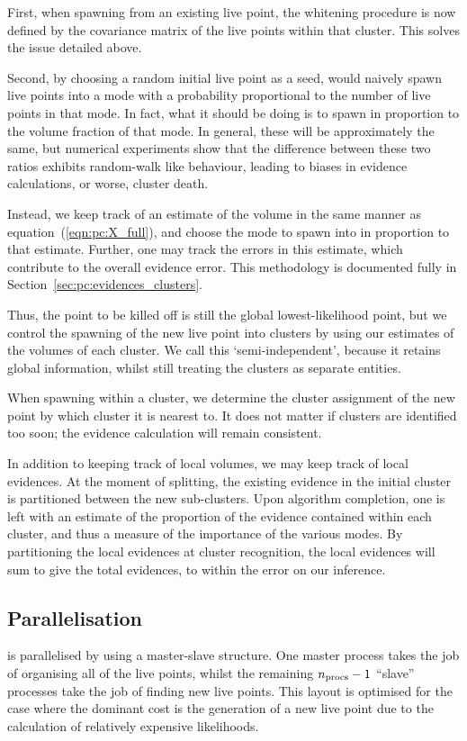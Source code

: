 First, when spawning from an existing live point, the whitening procedure is now defined by the covariance matrix of the live points within that cluster. This solves the issue detailed above.

Second, by choosing a random initial live point as a seed, \PolyChord{} would naively spawn live points into a mode with a probability proportional to the number of live points in that mode. In fact, what it should be doing is to spawn in proportion to the volume fraction of that mode. In general, these will be approximately the same, but numerical experiments show that the difference between these two ratios exhibits random-walk like behaviour, leading to biases in evidence calculations, or worse, cluster death. 

Instead, we keep track of an estimate of the volume in the same manner as equation~(\ref{eqn:pc:X_full}), and choose the mode to spawn into in proportion to that estimate. Further, one may track the errors in this estimate, which contribute to the overall evidence error. This methodology is documented fully in Section~\ref{sec:pc:evidences_clusters}.

Thus, the point to be killed off is still the global lowest-likelihood point, but we control the spawning of the new live point into clusters by using our estimates of the volumes of each cluster. We call this `semi-independent', because it retains global information, whilst still treating the clusters as separate entities. 

When spawning within a cluster, we determine the cluster assignment of the new point by which cluster it is nearest to. It does not matter if clusters are identified too soon; the evidence calculation will remain consistent.

In addition to keeping track of local volumes, we may keep track of local evidences. At the moment of splitting, the existing evidence in the initial cluster is partitioned between the new sub-clusters. Upon algorithm completion, one is left with an estimate of the proportion of the evidence contained within each cluster, and thus a measure of the importance of the various modes. By partitioning the local evidences at cluster recognition, the local evidences will sum to give the total evidences, to within the error on our inference.


\subsection{Parallelisation}
\label{sec:pc:parallelisation}
\PolyChord{} is parallelised by \openMPI{} using a master-slave structure.  One master process takes the job of organising all of the live points, whilst the remaining ${n_{\mathrm{procs}}-1}$ ``slave'' processes take the job of finding new live points. This layout is optimised for the case where the dominant cost is the generation of a new live point due to the calculation of relatively expensive likelihoods.

